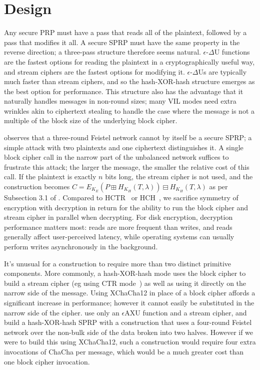 \documentclass[eprint.tex]{subfiles}
\begin{document}
\section{Design}
Any secure PRP must have a pass that reads all of the plaintext, followed by a pass that modifies
it all. A secure SPRP must have the same property in the reverse direction;
a three-pass structure therefore seems natural.
$\epsilon$-$\Delta$U functions are the fastest options for reading the plaintext in a
cryptographically useful way, and stream ciphers are the fastest options for modifying it.
$\epsilon$-$\Delta$Us
are typically much faster than stream ciphers, and so the hash-XOR-hash structure emerges as
the best option for performance. This structure also has the advantage that it naturally handles
messages in non-round sizes; many VIL modes need extra wrinkles akin to ciphertext stealing
to handle the case where the message is not
a multiple of the block size of the underlying block cipher.

\cite{luby-rackoff} observes that a three-round Feistel network cannot by itself be a secure SPRP;
a simple attack with two plaintexts and one ciphertext distinguishes it. A single block cipher call
in the narrow part of the unbalanced network suffices to frustrate this attack; the
larger the message, the smaller the relative cost of this call. If the plaintext is exactly $n$ bits
long, the stream cipher is not used, and the construction becomes
$C = E_{K_E}(P \boxplus H_{K_H}(T, \lambda)) \boxminus H_{K_H}(T, \lambda)$
as per Subsection 3.1 of \cite{tweakable}.
Compared to HCTR~\cite{hctr} or HCH~\cite{hch}, we sacrifice
symmetry of encryption with decryption in return for
the ability to run the block cipher and stream cipher in parallel when decrypting.
For disk encryption, decryption performance matters most:
reads are more frequent than writes, and reads generally affect user-perceived latency, while
operating systems can usually perform writes asynchronously in the background.

It's unusual for a construction to require more than two distinct primitive components.
More commonly, a hash-XOR-hash mode uses the block cipher to build a stream cipher
(eg using CTR mode~\cite{ctr})
as well as using it directly on the narrow side of the message.
Using XChaCha12 in place of a block cipher affords a significant increase in performance;
however it cannot easily be substituted in the narrow side of the cipher.
\cite{sarkar1,sarkar2,sarkar3,sarkar4} use only an $\epsilon$AXU function
and a stream cipher, and build a hash-XOR-hash SPRP
with a construction that uses a four-round Feistel network over the non-bulk side of the data
broken into two halves. However if we were to build this using XChaCha12,
such a construction would require four extra invocations of ChaCha per message, which would be
a much greater cost than one block cipher invocation.
\end{document}
